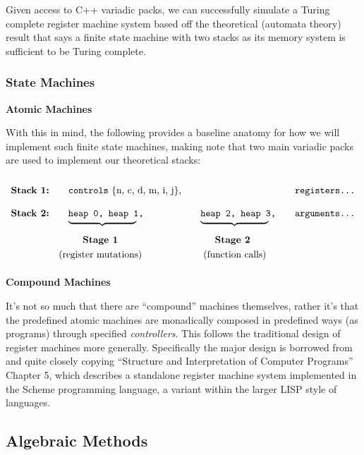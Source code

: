\documentclass[twoside]{article}
\newcommand{\strong}[1]{{\bfseries #1}}
\newcommand{\bfmbox}[1]{\mbox{\bfseries #1}}
\newcommand{\tab}[1][1.125cm]{\hspace{#1}}
\newcommand{\col}[1][0ex]{& \hspace{#1}}
\begin{document}
Given access to C++ variadic packs, we can successfully simulate a Turing complete register machine system based off the
theoretical (automata theory) result that says a finite state machine with two stacks as its memory system is sufficient
to be Turing complete.

\subsubsection*{State Machines}

\strong{Atomic Machines}

With this in mind, the following provides a baseline anatomy for how we will implement such finite
state machines, making note that two main variadic packs are used to implement our theoretical stacks:

$$ \def\arraystretch{2}
\tab[0cm] \begin{array}{llll}
\bfmbox{Stack 1:} \col[1em]   \texttt{controls}\mbox{ \{n, c, d, m, i, j\},}             \col\col[1em] \texttt{registers\ldots} \\
\bfmbox{Stack 2:} \col[1em]   \texttt{heap 0, heap 1,}  \col[1em]   \texttt{heap 2, heap 3,} \col[1em] \texttt{arguments\ldots} \\[-2em]
		  \col[1em]   \underbrace{\tab[2.5cm]}  \col[1em]   \underbrace{\tab[2.5cm]}                                    \\
		  \col[2.5em] \bfmbox{Stage 1}          \col[2.5em] \bfmbox{Stage 2}                                            \\[-2ex]
		  \col      \mbox{(register mutations)} \col[3ex] \mbox{(function calls)}
\end{array} $$

\strong{Compound Machines}

It's not so much that there are ``compound'' machines themselves, rather it's that the predefined atomic machines
are monadically composed in predefined ways (as programs) through specified \emph{controllers}. This follows the
traditional design of register machines more generally. Specifically the major design is borrowed from and quite
closely copying ``Structure and Interpretation of Computer Programs'' Chapter 5, which describes a standalone register
machine system implemented in the Scheme programming language, a variant within the larger LISP style of languages.

\subsection*{Algebraic Methods}
\end{document}
